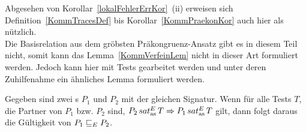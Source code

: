Abgesehen von Korollar~\ref{lokalFehlerErrKor}~(ii) erweisen sich
Definition~\ref{KommTracesDef} bis Korollar~\ref{KommPraekonKor} auch hier als
nützlich.\\
Die Basisrelation aus dem gröbsten Präkongruenz-Ansatz gibt es in diesem Teil
nicht, somit kann das Lemma~\ref{KommVerfeinLem} nicht in dieser Art formuliert
werden. Jedoch kann hier mit Tests gearbeitet werden und unter deren
Zuhilfenahme ein ähnliches Lemma formuliert werden.

\begin{Lem}
  \label{KommTestVerfeinLem}
  Gegeben sind zwei \MEIO{}s $P_1$ und $P_2$ mit der gleichen Signatur. Wenn
  für alle Tests $T$, die Partner von $P_1$ bzw. $P_2$ sind, $P_2\hspace{0.05cm}sat_\mathrm{as}^E\hspace{0.05cm} T
  \Rightarrow P_1\hspace{0.05cm}sat_\mathrm{as}^E\hspace{0.05cm} T$ gilt, dann folgt daraus die Gültigkeit von $P_1 \sqsubseteq  _E
  P_2$.
\end{Lem}
